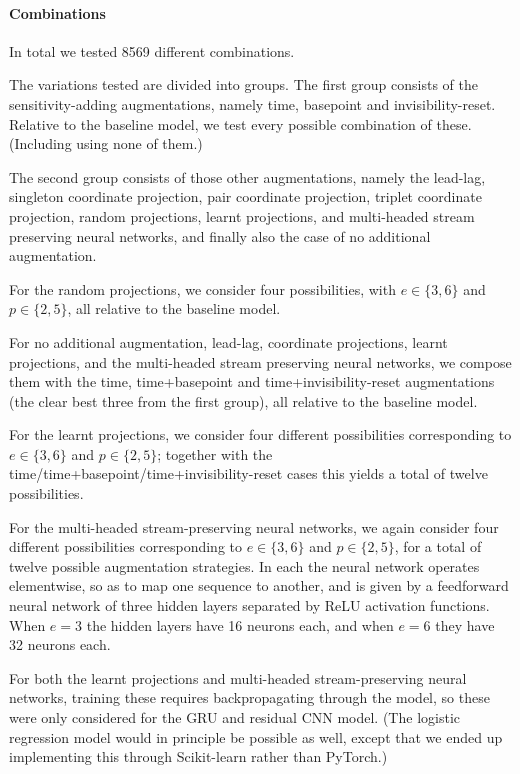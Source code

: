 \documentclass{article}
\theoremstyle{definition}
\theoremstyle{remark}
\begin{document}
	\paragraph{Combinations}
	In total we tested 8569 different combinations.
	
	The variations tested are divided into groups. The first group consists of the sensitivity-adding augmentations, namely time, basepoint and invisibility-reset. Relative to the baseline model, we test every possible combination of these. (Including using none of them.)
	
	The second group consists of those other augmentations, namely the lead-lag, singleton coordinate projection, pair coordinate projection, triplet coordinate projection, random projections, learnt projections, and multi-headed stream preserving neural networks, and finally also the case of no additional augmentation.
	
	For the random projections, we consider four possibilities, with $e \in \{3, 6\}$ and $p \in \{2, 5\}$, all relative to the baseline model.
	
	For no additional augmentation, lead-lag, coordinate projections, learnt projections, and the multi-headed stream preserving neural networks, we compose them with the time, time+basepoint and time+invisibility-reset augmentations (the clear best three from the first group), all relative to the baseline model.
	
	For the learnt projections, we consider four different possibilities corresponding to $e \in \{3, 6\}$ and $p \in \{2, 5\}$; together with the time/time+basepoint/time+invisibility-reset cases this yields a total of twelve possibilities.
	
	For the multi-headed stream-preserving neural networks, we again consider four different possibilities corresponding to $e \in \{3, 6\}$ and $p \in \{2, 5\}$, for a total of twelve possible augmentation strategies. In each the neural network operates elementwise, so as to map one sequence to another, and is given by a feedforward neural network of three hidden layers separated by ReLU activation functions. When $e = 3$ the hidden layers have 16 neurons each, and when $e = 6$ they have 32 neurons each.
	
	For both the learnt projections and multi-headed stream-preserving neural networks, training these requires backpropagating through the model, so these were only considered for the GRU and residual CNN model. (The logistic regression model would in principle be possible as well, except that we ended up implementing this through Scikit-learn rather than PyTorch.)
	
\end{document}
